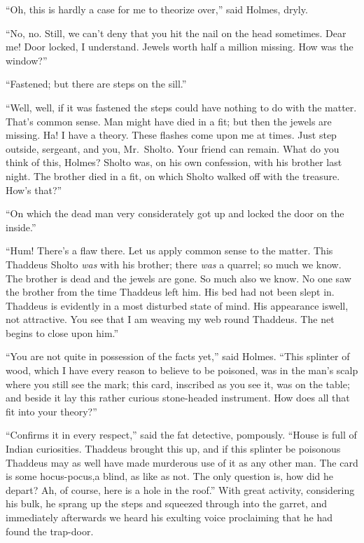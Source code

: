 \documentclass[12pt,english,oneside]{book}
\begin{document}
{}``Oh, this is hardly a case for me to theorize over,'' said Holmes,
dryly.

{}``No, no. Still, we can't deny that you hit the nail on the head
sometimes. Dear me! Door locked, I understand. Jewels worth half a
million missing. How was the window?''

{}``Fastened; but there are steps on the sill.''

{}``Well, well, if it was fastened the steps could have nothing to
do with the matter. That's common sense. Man might have died in a
fit; but then the jewels are missing. Ha! I have a theory. These flashes
come upon me at times.\mdsh{---} Just step outside, sergeant, and
you, Mr.\ Sholto. Your friend can remain.\mdsh{---} What do you
think of this, Holmes? Sholto was, on his own confession, with his
brother last night. The brother died in a fit, on which Sholto walked
off with the treasure. How's that?''

{}``On which the dead man very considerately got up and locked the
door on the inside.''

{}``Hum! There's a flaw there. Let us apply common sense to the matter.
This Thaddeus Sholto \textit{was} with his brother; there \textit{was}
a quarrel; so much we know. The brother is dead and the jewels are
gone. So much also we know. No one saw the brother from the time Thaddeus
left him. His bed had not been slept in. Thaddeus is evidently in
a most disturbed state of mind. His appearance is\mdsh{---}well,
not attractive. You see that I am weaving my web round Thaddeus. The
net begins to close upon him.''

{}``You are not quite in possession of the facts yet,'' said Holmes.
{}``This splinter of wood, which I have every reason to believe to
be poisoned, was in the man's scalp where you still see the mark;
this card, inscribed as you see it, was on the table; and beside it
lay this rather curious stone-headed instrument. How does all that
fit into your theory?''

{}``Confirms it in every respect,'' said the fat detective, pompously.
{}``House is full of Indian curiosities. Thaddeus brought this up,
and if this splinter be poisonous Thaddeus may as well have made murderous
use of it as any other man. The card is some hocus-pocus,\mdsh{---}a
blind, as like as not. The only question is, how did he depart? Ah,
of course, here is a hole in the roof.'' With great activity, considering
his bulk, he sprang up the steps and squeezed through into the garret,
and immediately afterwards we heard his exulting voice proclaiming
that he had found the trap-door.
\end{document}
